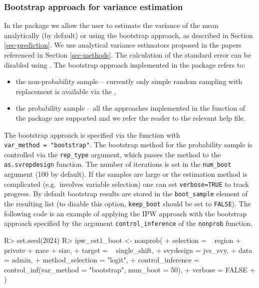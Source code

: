 \documentclass[
]{jss}
\begin{document}
\subsubsection{Bootstrap approach for variance
estimation}\label{bootstrap-approach-for-variance-estimation}

In the package we allow the user to estimate the variance of the mean
analytically (by default) or using the bootstrap approach, as described
in Section \ref{sec-prediction}. We use analytical variance estimators
proposed in the papers referenced in Section \ref{sec-methods}. The
calculation of the standard error can be disabled using
. The bootstrap approach implemented in the
package refers to:

\begin{itemize}
\item the non-probability sample -- currently only simple random sampling with replacement is available via the ,
\item the probability sample -- all the approaches implemented in the  function of the  package are supported and we refer the reader to the relevant help file. 
\end{itemize}

The bootstrap approach is specified via the 
function with \texttt{var\_method\ =\ "bootstrap"}. The bootstrap method
for the probability sample is controlled via the \texttt{rep\_type}
argument, which passes the method to the \texttt{as.svrepdesign}
function. The number of iterations is set in the \texttt{num\_boot}
argument (100 by default). If the samples are large or the estimation
method is complicated (e.g.~involves variable selection) one can set
\texttt{verbose=TRUE} to track progress. By default bootstrap results
are stored in the \texttt{boot\_sample} element of the resulting list
(to disable this option, \texttt{keep\_boot} should be set to
\texttt{FALSE}). The following code is an example of applying the IPW
approach with the bootstrap approach specified by the argument
\texttt{control\_inference} of the \texttt{nonprob} function.

\begin{CodeChunk}
\begin{CodeInput}
R> set.seed(2024)
R> ipw_est1_boot <- nonprob(
+   selection = ~ region + private + nace + size,
+   target = ~ single_shift,
+   svydesign = jvs_svy,
+   data = admin,
+   method_selection = "logit",
+   control_inference = control_inf(var_method = "bootstrap", num_boot = 50),
+   verbose = FALSE
+ )
\end{CodeInput}
\end{CodeChunk}
\end{document}
